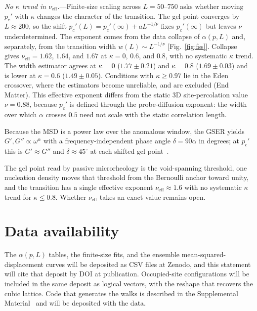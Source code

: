 \documentclass[aps,prl,twocolumn,superscriptaddress,floatfix,nofootinbib,longbibliography]{revtex4-2}
\newcommand{\pcp}{p_c'}
\newcommand{\kap}{\kappa}
\newcommand{\nueff}{\nu_{\mathrm{eff}}}
\begin{document}
\emph{No $\kap$ trend in $\nueff$.}---Finite-size scaling across $L=50$--$750$ asks whether moving $\pcp$ with $\kap$ changes the character of the transition. The gel point converges by $L\approx200$, so the shift $\pcp(L)=\pcp(\infty)+aL^{-1/\nu}$ fixes $\pcp(\infty)$ but leaves $\nu$ underdetermined. The exponent comes from the data collapse of $\alpha(p,L)$ and, separately, from the transition width $w(L)\sim L^{-1/\nu}$ [Fig.~\ref{fig:fss}]. Collapse gives $\nueff=1.62$, $1.64$, and $1.67$ at $\kap=0$, $0.6$, and $0.8$, with no systematic $\kap$ trend. The width estimator agrees at $\kap=0$ ($1.77\pm0.21$) and $\kap=0.8$ ($1.69\pm0.03$) and is lower at $\kap=0.6$ ($1.49\pm0.05$). Conditions with $\kap\ge0.97$ lie in the Eden crossover, where the estimators become unreliable, and are excluded (End Matter). This effective exponent differs from the static 3D site-percolation value $\nu=0.88$, because $\pcp$ is defined through the probe-diffusion exponent: the width over which $\alpha$ crosses $0.5$ need not scale with the static correlation length.

Because the MSD is a power law over the anomalous window, the GSER yields $G',G''\propto\omega^{\alpha}$ with a frequency-independent phase angle $\delta=90\alpha$ in degrees; at $\pcp$ this is $G'\approx G''$ and $\delta\approx45^{\circ}$ at each shifted gel point~\cite{SM}.

The gel point read by passive microrheology is the void-spanning threshold, one nucleation density moves that threshold from the Bernoulli anchor toward unity, and the transition has a single effective exponent $\nueff\approx1.6$ with no systematic $\kap$ trend for $\kap\le0.8$. Whether $\nueff$ takes an exact value remains open.

\begin{acknowledgments}
\end{acknowledgments}

\section*{Data availability}
The $\alpha(p,L)$ tables, the finite-size fits, and the ensemble mean-squared-displacement curves will be deposited as CSV files at Zenodo, and this statement will cite that deposit by DOI at publication. Occupied-site configurations will be included in the same deposit as logical vectors, with the reshape that recovers the cubic lattice. Code that generates the walks is described in the Supplemental Material~\cite{SM} and will be deposited with the data.
\end{document}
